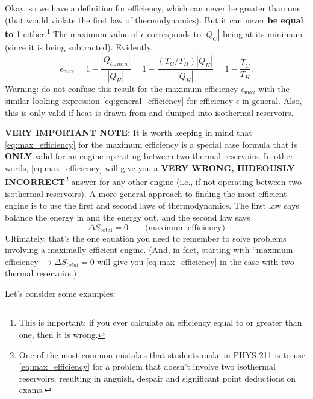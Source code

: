 Okay, so we have a definition for efficiency, which can never be
greater than one (that would violate the first law of thermodynamics).
But it can never \textbf{be equal to} 1 either.\footnote{This is
  important: if you ever calculate an efficiency equal to or greater
  than one, then it is wrong.}  The maximum value of $\epsilon$
corresponds to $|Q_C|$ being at its minimum (since it is being subtracted).
Evidently,
\begin{equation}
\epsilon_\text{max} = 1 - \frac{|Q_{C,{ min}}|}{|Q_H|} = 1 -
\frac{(T_C/T_H)|Q_H|}{|Q_H|} = 1-\frac{T_C}{T_H}.
\label{eq:max_efficiency}
\end{equation}
Warning: do not confuse this result for the maximum efficiency
$\epsilon_\text{max}$ with the similar looking expression
\eqref{eq:general_efficiency} for efficiency $\epsilon$ in general.
Also, this is only valid if heat is drawn from and dumped into 
isothermal reservoirs.

\textbf{VERY IMPORTANT NOTE:} It is worth keeping in mind that \eqref{eq:max_efficiency} for the
maximum efficiency is a special case formula that is \textbf{ONLY} valid for 
an engine operating between two thermal reservoirs.  In other words, 
\eqref{eq:max_efficiency} will give you a \textbf{VERY WRONG, HIDEOUSLY
INCORRECT}\footnote{One of the most common mistakes that students make
in PHYS 211 is to use \eqref{eq:max_efficiency} for a problem that doesn't
involve two isothermal reservoirs, resulting in anguish, despair and 
significant point deductions on exams.}
 answer for any other engine (i.e., if not operating
between two isothermal reservoirs).  A more general approach to
finding the most efficient engine is to
use the first and second laws of thermodynamics.  The first law says
balance the energy in and the energy out, and the second law says
\begin{equation}
\Delta S_\text{total} = 0 \qquad\text{(maximum efficiency)}
\end{equation}
Ultimately, that's the one equation you need to remember
to solve problems involving a maximally efficient engine.
(And, in fact, starting with ``maximum efficiency $\rightarrow
\Delta S_{total}=0$ will give you \eqref{eq:max_efficiency}
in the case with two thermal reservoirs.)

Let's consider some examples:


